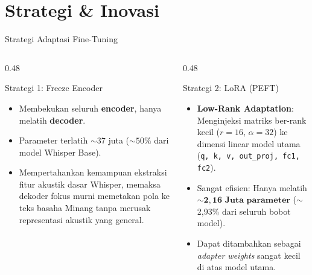 \section{Strategi \& Inovasi}

\begin{frame}{Strategi Adaptasi Fine-Tuning}
    \begin{columns}[T]
        \begin{column}{0.48\textwidth}
            \begin{block}{Strategi 1: Freeze Encoder}
                \begin{itemize}
                    \item Membekukan seluruh \textbf{encoder}, hanya melatih \textbf{decoder}.
                    \item Parameter terlatih \(\sim 37\) juta (\(\sim 50\%\) dari model Whisper Base).
                    \item Mempertahankan kemampuan ekstraksi fitur akustik dasar Whisper, memaksa dekoder fokus murni memetakan pola ke teks basaha Minang tanpa merusak representasi akustik yang general.
                \end{itemize}
            \end{block}
        \end{column}
        \hfill
        \begin{column}{0.48\textwidth}
            \begin{exampleblock}{Strategi 2: LoRA (PEFT)}
                \begin{itemize}
                    \item \textbf{Low-Rank Adaptation}: Menginjeksi matriks ber-rank kecil (\(r = 16\), \(\alpha = 32\)) ke dimensi linear model utama (\texttt{q, k, v, out\_proj, fc1, fc2}).
                    \item Sangat efisien: Hanya melatih \(\boldsymbol{\sim 2,16 \text{ Juta parameter}}\) ($\sim$2,93\% dari seluruh bobot model).
                    \item Dapat ditambahkan sebagai \textit{adapter weights} sangat kecil di atas model utama.
                \end{itemize}
            \end{exampleblock}
        \end{column}
    \end{columns}
\end{frame}

